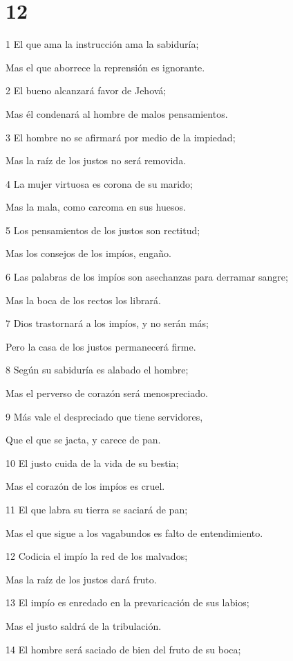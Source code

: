 \chapter{12}

\par 1 El que ama la instrucción ama la sabiduría;
\par Mas el que aborrece la reprensión es ignorante.
\par 2 El bueno alcanzará favor de Jehová;
\par Mas él condenará al hombre de malos pensamientos.
\par 3 El hombre no se afirmará por medio de la impiedad;
\par Mas la raíz de los justos no será removida.
\par 4 La mujer virtuosa es corona de su marido;
\par Mas la mala, como carcoma en sus huesos.
\par 5 Los pensamientos de los justos son rectitud;
\par Mas los consejos de los impíos, engaño.
\par 6 Las palabras de los impíos son asechanzas para derramar sangre;
\par Mas la boca de los rectos los librará.
\par 7 Dios trastornará a los impíos, y no serán más;
\par Pero la casa de los justos permanecerá firme.
\par 8 Según su sabiduría es alabado el hombre;
\par Mas el perverso de corazón será menospreciado.
\par 9 Más vale el despreciado que tiene servidores,
\par Que el que se jacta, y carece de pan.
\par 10 El justo cuida de la vida de su bestia;
\par Mas el corazón de los impíos es cruel.
\par 11 El que labra su tierra se saciará de pan;
\par Mas el que sigue a los vagabundos es falto de entendimiento.
\par 12 Codicia el impío la red de los malvados;
\par Mas la raíz de los justos dará fruto.
\par 13 El impío es enredado en la prevaricación de sus labios;
\par Mas el justo saldrá de la tribulación.
\par 14 El hombre será saciado de bien del fruto de su boca;
